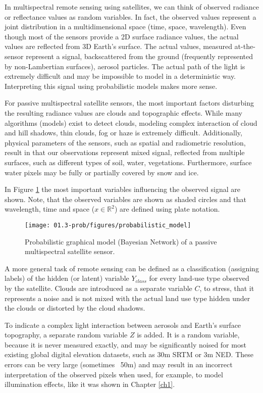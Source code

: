 In multispectral remote sensing using satellites, we can think of observed radiance or reflectance values as random variables. In fact, the observed values represent a joint distribution in a multidimensional space (time, space, wavelength). Even though most of the sensors provide a 2D surface radiance values, the actual values are reflected from 3D Earth's surface. The actual values, measured at-the-sensor represent a signal, backscattered from the ground (frequently represented by non-Lambertian surfaces), aerosol particles. The actual path of the light is extremely difficult and may be impossible to model in a deterministic way. Interpreting this signal using probabilistic models makes more sense.

For passive multispectral satellite sensors, the most important factors disturbing the resulting radiance values are clouds and topographic effects. While many algorithms (models) exist to detect clouds, modeling complex interaction of cloud and hill shadows, thin clouds, fog or haze is extremely difficult. Additionally, physical parameters of the sensors, such as spatial and radiometric resolution, result in that our observations represent mixed signal, reflected from multiple surfaces, such as different types of soil, water, vegetations. Furthermore, surface water pixels may be fully or partially covered by snow and ice.

In Figure \ref{fig:pgm} the most important variables influencing the observed signal are shown. Note, that the observed variables are shown as shaded circles and that wavelength, time and space ($x \in \mathbb{R}^2$) are defined using plate notation.

\begin{figure}
	\centering
	\texttt{[image: 01.3-prob/figures/probabilistic\_model]} 
	\caption{Probabilistic graphical model (Bayesian Network) of a passive multispectral satellite sensor.}
	\label{fig:pgm}
\end{figure}

A more general task of remote sensing can be defined as a classification (assigning labels) of the hidden (or latent) variable $Y_{class}$ for every land-use type observed by the satellite. Clouds are introduced as a separate variable $C$, to stress, that it represents a noise and is not mixed with the actual land use type hidden under the clouds or distorted by the cloud shadows. 

To indicate a complex light interaction between aerosols and Earth's surface topography, a separate random variable $Z$ is added. It is a random variable, because it is never measured exactly, and may be significantly noised for most existing global digital elevation datasets, such as 30m SRTM or 3m NED. These errors can be very large (sometimes ~50m) and may result in an incorrect interpretation of the observed pixels when used, for example, to model illumination effects, like it was shown in Chapter \ref{ch1}.

